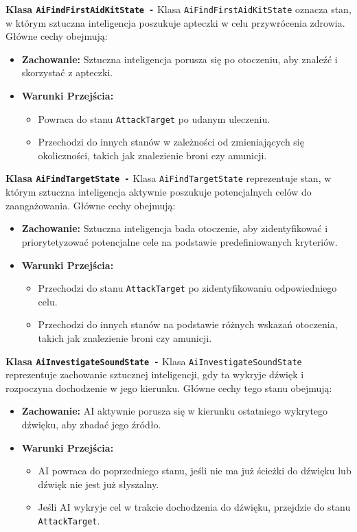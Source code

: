 \textbf{Klasa \texttt{AiFindFirstAidKitState -}}
Klasa \texttt{AiFindFirstAidKitState} oznacza stan, w którym sztuczna inteligencja poszukuje apteczki w celu przywrócenia zdrowia. Główne cechy obejmują:
\begin{itemize}
  \item \textbf{Zachowanie:} Sztuczna inteligencja porusza się po otoczeniu, aby znaleźć i skorzystać z apteczki.
  \item \textbf{Warunki Przejścia:}
    \begin{itemize}
      \item Powraca do stanu \texttt{AttackTarget} po udanym uleczeniu.
      \item Przechodzi do innych stanów w zależności od zmieniających się okoliczności, takich jak znalezienie broni czy amunicji.
    \end{itemize}
\end{itemize}

\textbf{Klasa \texttt{AiFindTargetState -}}
Klasa \texttt{AiFindTargetState} reprezentuje stan, w którym sztuczna inteligencja aktywnie poszukuje potencjalnych celów do zaangażowania. Główne cechy obejmują:
\begin{itemize}
  \item \textbf{Zachowanie:} Sztuczna inteligencja bada otoczenie, aby zidentyfikować i priorytetyzować potencjalne cele na podstawie predefiniowanych kryteriów.
  \item \textbf{Warunki Przejścia:}
    \begin{itemize}
      \item Przechodzi do stanu \texttt{AttackTarget} po zidentyfikowaniu odpowiedniego celu.
      \item Przechodzi do innych stanów na podstawie różnych wskazań otoczenia, takich jak znalezienie broni czy amunicji.
    \end{itemize}
\end{itemize}

\textbf{Klasa \texttt{AiInvestigateSoundState -}}
Klasa \texttt{AiInvestigateSoundState} reprezentuje zachowanie sztucznej inteligencji, gdy ta wykryje dźwięk i rozpoczyna dochodzenie w jego kierunku. Główne cechy tego stanu obejmują:
\begin{itemize}
  \item \textbf{Zachowanie:} AI aktywnie porusza się w kierunku ostatniego wykrytego dźwięku, aby zbadać jego źródło.
  \item \textbf{Warunki Przejścia:}
    \begin{itemize}
      \item AI powraca do poprzedniego stanu, jeśli nie ma już ścieżki do dźwięku lub dźwięk nie jest już słyszalny.
      \item Jeśli AI wykryje cel w trakcie dochodzenia do dźwięku, przejdzie do stanu \texttt{AttackTarget}.
    \end{itemize}
\end{itemize}

